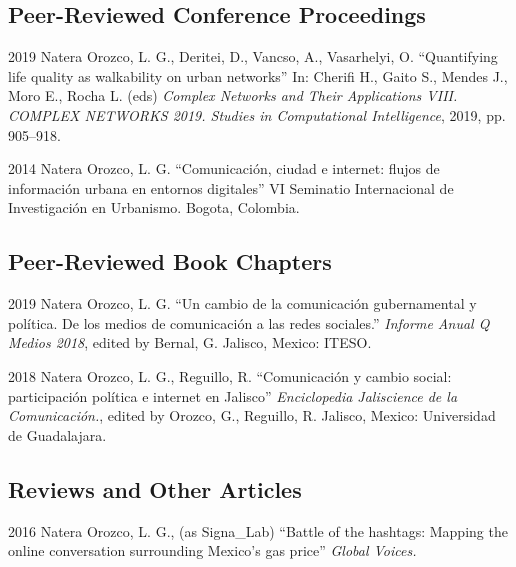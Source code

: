 \documentclass{academiccv}
\begin{document}
	

\subsection*{Peer-Reviewed Conference Proceedings}
\begin{tablist}
	\item[2019] \tab Natera Orozco, L. G., Deritei, D., Vancso, A., Vasarhelyi, O. \enquote{Quantifying life quality as walkability on urban networks} In: Cherifi H., Gaito S., Mendes J., Moro E., Rocha L. (eds) \textit{Complex Networks and Their Applications VIII. COMPLEX NETWORKS 2019. Studies in Computational Intelligence}, 2019, pp. 905–918.
	\item[2014] \tab Natera Orozco, L. G. \enquote{Comunicación, ciudad e internet: flujos de información urbana en entornos digitales} VI Seminatio Internacional de Investigación en Urbanismo. Bogota, Colombia.
\end{tablist}

\subsection*{Peer-Reviewed Book Chapters}
\begin{tablist}
	\item[2019] \tab Natera Orozco, L. G. \enquote{Un cambio de la comunicación gubernamental y política. De los medios de comunicación a las redes sociales.} \textit{Informe Anual Q Medios 2018}, edited by Bernal, G. Jalisco, Mexico: ITESO.
	\item[2018] \tab Natera Orozco, L. G., Reguillo, R. \enquote{Comunicación y cambio social: participación política e internet en Jalisco} \textit{Enciclopedia Jaliscience de la Comunicación.}, edited by Orozco, G., Reguillo, R. Jalisco, Mexico: Universidad de Guadalajara.
\end{tablist}

\subsection*{Reviews and Other Articles}
\begin{tablist}
	\item[2016] \tab Natera Orozco, L. G., (as Signa\_Lab) \enquote{Battle of the hashtags: Mapping the online conversation surrounding Mexico's gas price} \textit{Global Voices.}
\end{tablist}
\end{document}
